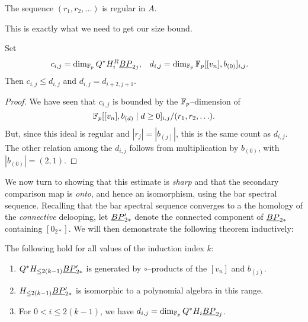 \begin{lemma}
The sequence $(r_1, r_2, \ldots)$ is regular in $A$. \qedhere
\end{lemma}

\noindent This is exactly what we need to get our size bound.

\begin{lemma}
Set
\begin{align*}
c_{i,j} & = \dim_{\mathbb F_p} Q^* H_i^R \underline{\smash{BP}}_{2j}, &
d_{i,j} & = \dim_{\mathbb F_p} \mathbb F_p[[v_n], b_{(0)}]_{i,j}.
\end{align*}
Then $c_{i,j} \le d_{i,j}$ and $d_{i,j} = d_{i+2,j+1}$.
\end{lemma}
\begin{proof}
We have seen that $c_{i,j}$ is bounded by the $\mathbb F_p$--dimension of \[\mathbb F_p[[v_n], b_{(d)} \mid d \ge 0]_{i,j} / (r_1, r_2, \ldots).\]  But, since this ideal is regular and $|r_j| = |b_{(j)}|$, this is the same count as $d_{i,j}$.  The other relation among the $d_{i,j}$ follows from multiplication by $b_{(0)}$, with $|b_{(0)}| = (2, 1)$.
\end{proof}

We now turn to showing that this estimate is \emph{sharp} and that the secondary comparison map is \emph{onto}, and hence an isomorphism, using the bar spectral sequence.  Recalling that the bar spectral sequence converges to a the homology of the \emph{connective} delooping, let $\underline{\smash{BP}}_{2*}'$ denote the connected component of $\underline{\smash{BP}}_{2*}$ containing $[0_{2*}]$.  We will then demonstrate the following theorem inductively:
\begin{theorem}\label{HFpBPCooperationsInduction}
The following hold for all values of the induction index $k$:
\begin{enumerate}
\item $Q^* H_{\le 2(k-1)} \underline{\smash{BP}}_{2*}'$ is generated by $\circ$--products of the $[v_n]$ and $b_{(j)}$.
\item $H_{\le 2(k-1)} \underline{\smash{BP}}_{2*}'$ is isomorphic to a polynomial algebra in this range.
\item For $0 < i \le 2(k-1)$, we have $d_{i,j} = \dim_{\mathbb F_p} Q^* H_i \underline{\smash{BP}}_{2j}$.
\end{enumerate}
\end{theorem}

